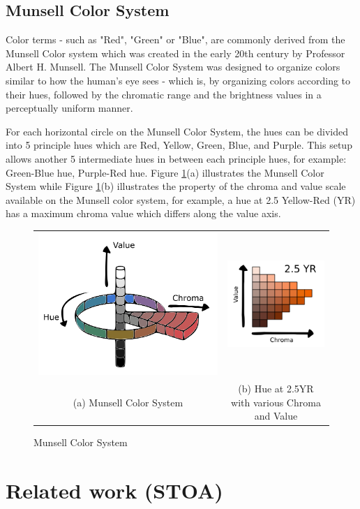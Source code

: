 \subsection{Munsell Color System}
\label{section:munsellcs}
Color terms - such as "Red", "Green" or "Blue", are commonly derived from the Munsell Color system which was created in the early 20th century by Professor Albert H. Munsell. The Munsell Color System was designed to organize colors similar to how the human's eye sees - which is, by organizing colors according to their hues, followed by the chromatic range and the brightness values in a perceptually uniform manner. 

For each horizontal circle on the Munsell Color System, the hues can be divided into 5 principle hues which are Red, Yellow, Green, Blue, and Purple. This setup allows another 5 intermediate hues in between each principle hues, for example: Green-Blue hue, Purple-Red hue. 
Figure \ref{fig:munsell}(a) illustrates the Munsell Color System while Figure \ref{fig:munsell}(b) illustrates the property of the chroma and value scale available on the Munsell color system, for example, a hue at 2.5 Yellow-Red (YR) has a maximum chroma value which differs along the value axis. 



\begin{figure}[!htb]
  \centering
\begin{tabular}{cc}
 \includegraphics[width=0.4\linewidth]{image/general/munsell.png}  &
 \includegraphics[width=0.4\linewidth]{image/general/25YR.png}\\
 (a) Munsell Color System &
(b) Hue at 2.5YR with various Chroma and Value\\
\end{tabular}
\caption{Munsell Color System} \label{fig:munsell}
\end{figure}


\section{Related work (STOA)}
\label{section:litreview}

